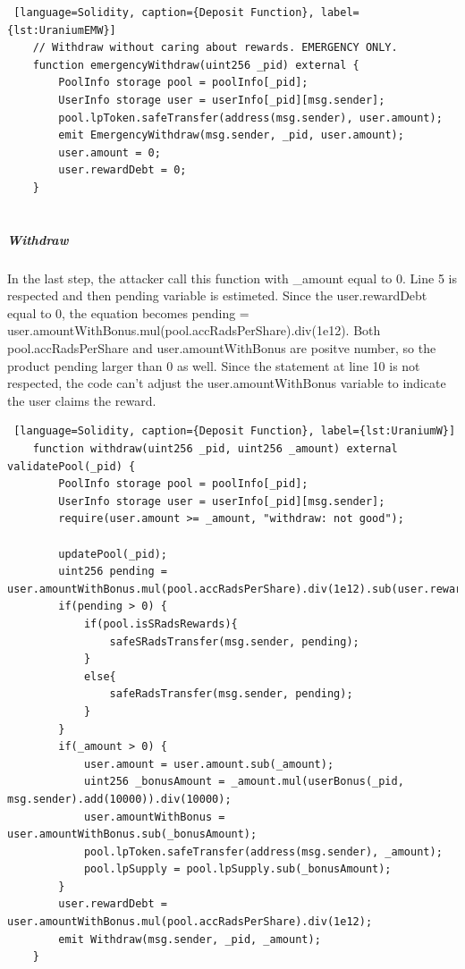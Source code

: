 \begin{lstlisting} [language=Solidity, caption={Deposit Function}, label={lst:UraniumEMW}]
    // Withdraw without caring about rewards. EMERGENCY ONLY.
    function emergencyWithdraw(uint256 _pid) external {
        PoolInfo storage pool = poolInfo[_pid];
        UserInfo storage user = userInfo[_pid][msg.sender];
        pool.lpToken.safeTransfer(address(msg.sender), user.amount);
        emit EmergencyWithdraw(msg.sender, _pid, user.amount);
        user.amount = 0;
        user.rewardDebt = 0;
    }
    
\end{lstlisting} 

\subparagraph{Withdraw} In the last step, the attacker call this function with \_amount equal to 0.
Line 5 is respected and then pending variable is estimeted.
Since the user.rewardDebt equal to 0, the equation becomes
pending = user.amountWithBonus.mul(pool.accRadsPerShare).div(1e12).
Both pool.accRadsPerShare and user.amountWithBonus are positve number, so the product pending larger than 0 as well.
Since the statement at line 10 is not respected, the code can't adjust the user.amountWithBonus variable to indicate the user claims the reward.

\begin{lstlisting} [language=Solidity, caption={Deposit Function}, label={lst:UraniumW}]
    function withdraw(uint256 _pid, uint256 _amount) external validatePool(_pid) {
        PoolInfo storage pool = poolInfo[_pid];
        UserInfo storage user = userInfo[_pid][msg.sender];
        require(user.amount >= _amount, "withdraw: not good");

        updatePool(_pid);
        uint256 pending = user.amountWithBonus.mul(pool.accRadsPerShare).div(1e12).sub(user.rewardDebt);
        if(pending > 0) {
            if(pool.isSRadsRewards){
                safeSRadsTransfer(msg.sender, pending);
            }
            else{
                safeRadsTransfer(msg.sender, pending);
            }
        }
        if(_amount > 0) {
            user.amount = user.amount.sub(_amount);
            uint256 _bonusAmount = _amount.mul(userBonus(_pid, msg.sender).add(10000)).div(10000);
            user.amountWithBonus = user.amountWithBonus.sub(_bonusAmount);
            pool.lpToken.safeTransfer(address(msg.sender), _amount);
            pool.lpSupply = pool.lpSupply.sub(_bonusAmount);
        }
        user.rewardDebt = user.amountWithBonus.mul(pool.accRadsPerShare).div(1e12);
        emit Withdraw(msg.sender, _pid, _amount);
    }

\end{lstlisting} 

